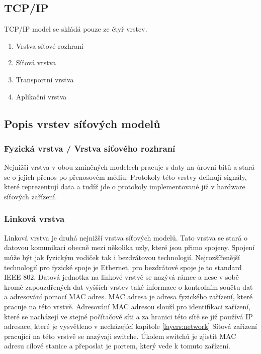 \subsection{TCP/IP}
TCP/IP model se skládá pouze ze čtyř vrstev.

\begin{enumerate}
	\item{Vrstva síťové rozhraní}
	\item{Síťová vrstva}
	\item{Transportní vrstva}
	\item{Aplikační vrstva}
\end{enumerate}

\subsection{Popis vrstev síťových modelů}

\subsubsection{Fyzická vrstva / Vrstva síťového rozhraní}\label{layers:physical}
Nejnižší vrstva v obou zmíněných modelech pracuje s daty na úrovni bitů a stará se o
jejich přenos po přenosovém médiu. Protokoly této vrstvy definují signály, které reprezentují data
a tudíž jde o protokoly implementované již v hardware síťových zařízení.

\subsubsection{Linková vrstva}\label{layers:link}
Linková vrstva je druhá nejnižší vrstva síťových modelů. Tato vrstva se stará o datovou komunikaci
obecně mezi několika uzly, které jsou přimo spojeny. Spojení může být jak fyzickým vodiček tak i
bezdrátovou technologií. Nejrozšířenější technologií pro fyzické spoje je Ethernet, pro bezdrátové spoje
je to standard IEEE 802. Datová jednotka na linkové vrstvě se nazývá rámec a nese v sobě kromě
zapouzdřených dat vyšších vrstev také informace o kontrolním součtu dat a adresování pomocí MAC adres.
MAC adresa je adresa fyzického zařízení, které pracuje na této vrstvě.
Adresování MAC adresou slouží pro identifikaci zařízení, které se nacházejí ve stejné počítačové síti
a za hranici této sítě se již používá IP adresace, které je vysvětleno v necházející kapitole \ref{layers:network}
Síťová zařizení pracující na této vrstvě se nazývaji switche. Úkolem switchů je zjistit MAC adresu cílové stanice a přeposlat je portem, který vede k tomuto zařízení.

